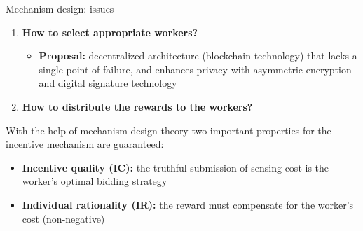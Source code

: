 \begin{frame}{Mechanism design: issues}
  		\begin{enumerate}
   			\item \textbf{How to select appropriate workers?}
   				\begin{itemize}
   					\item \textbf{Proposal: } decentralized architecture (blockchain technology) that lacks a single point of failure, and enhances privacy with asymmetric encryption and digital signature technology
   				\end{itemize}
    		\item \textbf{How to distribute the rewards to the workers?}
  		\end{enumerate}
  		With the help of \alert{mechanism design theory}\cite{article56} two important properties for the incentive mechanism are guaranteed:
  		\begin{itemize}
   					\item \textbf{Incentive quality (IC):} the truthful submission of sensing  cost is the worker's optimal bidding strategy
   					\item \textbf{Individual rationality (IR):} the reward must compensate for the worker's cost (non-negative)
   		\end{itemize}
\end{frame}
